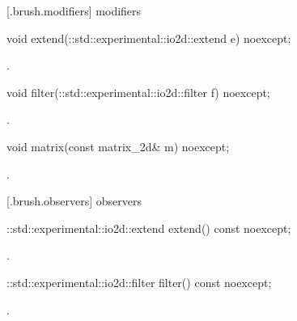  [\iotwod.brush.modifiers]{ modifiers}

\begin{itemdecl}
    void extend(::std::experimental::io2d::extend e) noexcept;
\end{itemdecl}
\begin{itemdescr}
	\pnum
	\postconditions
	.
	
\end{itemdescr}

\begin{itemdecl}
    void filter(::std::experimental::io2d::filter f) noexcept;
\end{itemdecl}
\begin{itemdescr}
	\pnum
	\postconditions
	.
	
\end{itemdescr}

\begin{itemdecl}
    void matrix(const matrix_2d& m) noexcept;
\end{itemdecl}
\begin{itemdescr}
	\pnum
	\postconditions
	.
	
\end{itemdescr}

 [\iotwod.brush.observers]{ observers}

\begin{itemdecl}
    ::std::experimental::io2d::extend extend() const noexcept;
\end{itemdecl}
\begin{itemdescr}
	\pnum
	\returns
	.

\end{itemdescr}

\begin{itemdecl}
    ::std::experimental::io2d::filter filter() const noexcept;
\end{itemdecl}
\begin{itemdescr}
	\pnum
	\returns
	.

\end{itemdescr}

